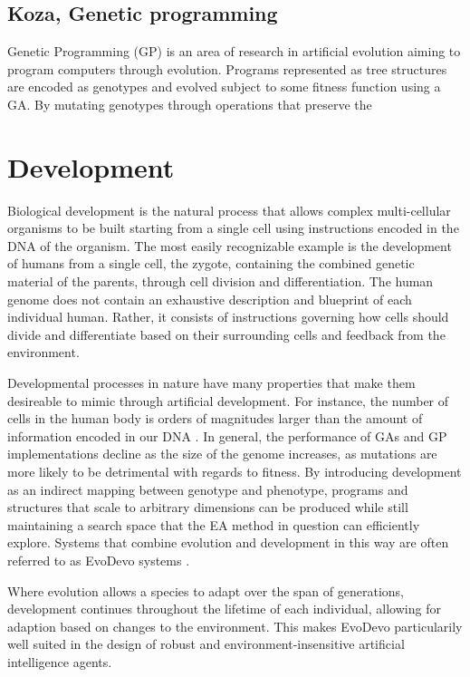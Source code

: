 \subsection{Koza, Genetic programming}

Genetic Programming (GP) is an area of research in artificial evolution aiming
to program computers through evolution. Programs represented as tree structures
are encoded as genotypes and evolved subject to some fitness function using a
GA. By mutating genotypes through operations that preserve the 

\section{Development}

Biological development is the natural process that allows complex multi-cellular
organisms to be built starting from a single cell using instructions encoded in
the DNA of the organism. The most easily recognizable example is the development
of humans from a single cell, the zygote, containing the combined genetic
material of the parents, through cell division and differentiation. The human
genome does not contain an exhaustive description and blueprint of each
individual human. Rather, it consists of instructions governing how cells should
divide and differentiate based on their surrounding cells and feedback from the
environment.

Developmental processes in nature have many properties that make them desireable
to mimic through artificial development. For instance, the number of cells in
the human body is orders of magnitudes larger than the amount of information
encoded in our DNA \cite{Bianconi2013}. In general, the performance of GAs and
GP implementations decline as the size of the genome increases, as mutations are
more likely to be detrimental with regards to fitness. By introducing
development as an indirect mapping between genotype and phenotype, programs and
structures that scale to arbitrary dimensions can be produced while still
maintaining a search space that the EA method in question can efficiently
explore. Systems that combine evolution and development in this way are often
referred to as EvoDevo systems \cite{Hall2003}.

Where evolution allows a species to adapt over the span of generations,
development continues throughout the lifetime of each individual, allowing for
adaption based on changes to the environment. This makes EvoDevo particularily
well suited in the design of robust and environment-insensitive artificial
intelligence agents.


